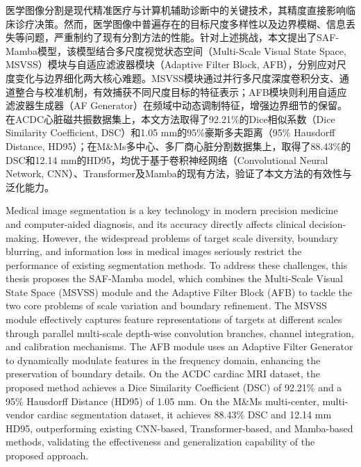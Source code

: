 \documentclass[12pt, a4paper, twoside]{article}
\begin{document}

\reAbstract

医学图像分割是现代精准医疗与计算机辅助诊断中的关键技术，其精度直接影响临床诊疗决策。然而，医学图像中普遍存在的目标尺度多样性以及边界模糊、信息丢失等问题，严重制约了现有分割方法的性能。针对上述挑战，本文提出了SAF-Mamba模型，该模型结合多尺度视觉状态空间（Multi-Scale Visual State Space, MSVSS）模块与自适应滤波器模块（Adaptive Filter Block, AFB），分别应对尺度变化与边界细化两大核心难题。MSVSS模块通过并行多尺度深度卷积分支、通道整合与校准机制，有效捕获不同尺度目标的特征表示；AFB模块则利用自适应滤波器生成器（AF Generator）在频域中动态调制特征，增强边界细节的保留。在ACDC心脏磁共振数据集上，本文方法取得了92.21\%的Dice相似系数（Dice Similarity Coefficient, DSC）和1.05 mm的95\%豪斯多夫距离（95\% Hausdorff Distance, HD95）；在M\&Ms多中心、多厂商心脏分割数据集上，取得了88.43\%的DSC和12.14 mm的HD95，均优于基于卷积神经网络（Convolutional Neural Network, CNN）、Transformer及Mamba的现有方法，验证了本文方法的有效性与泛化能力。


\reAbstractEN

Medical image segmentation is a key technology in modern precision medicine and computer-aided diagnosis, and its accuracy directly affects clinical decision-making. However, the widespread problems of target scale diversity, boundary blurring, and information loss in medical images seriously restrict the performance of existing segmentation methods. To address these challenges, this thesis proposes the SAF-Mamba model, which combines the Multi-Scale Visual State Space (MSVSS) module and the Adaptive Filter Block (AFB) to tackle the two core problems of scale variation and boundary refinement. The MSVSS module effectively captures feature representations of targets at different scales through parallel multi-scale depth-wise convolution branches, channel integration, and calibration mechanisms. The AFB module uses an Adaptive Filter Generator to dynamically modulate features in the frequency domain, enhancing the preservation of boundary details. On the ACDC cardiac MRI dataset, the proposed method achieves a Dice Similarity Coefficient (DSC) of 92.21\% and a 95\% Hausdorff Distance (HD95) of 1.05 mm. On the M\&Ms multi-center, multi-vendor cardiac segmentation dataset, it achieves 88.43\% DSC and 12.14 mm HD95, outperforming existing CNN-based, Transformer-based, and Mamba-based methods, validating the effectiveness and generalization capability of the proposed approach.
\end{document}
